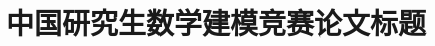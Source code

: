 \documentclass{gmcmthesis}
\title{中国研究生数学建模竞赛论文标题}
\begin{document}
\maketitle




\newpage


\newpage
\begin{appendices}


\end{appendices}
\end{document}

